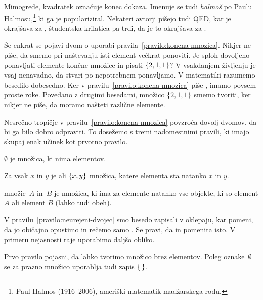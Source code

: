 Mimogrede, kvadratek označuje konec dokaza. Imenuje se tudi \emph{halmoš} po
Paulu Halmosu,\footnote{Paul Halmos (1916--2006), ameriški matematik madžarskega rodu.} ki ga je populariziral. Nekateri avtorji pišejo tudi QED, kar je okrajšava za , študentska krilatica pa trdi, da je to okrajšava za .

Še enkrat se pojavi dvom o uporabi pravila~\ref{pravilo:koncna-mnozica}. Nikjer ne piše, da smemo pri naštevanju isti element večkrat ponoviti. Je sploh dovoljeno ponavljati elemente končne množice in pisati $\left\{2, 1, 1\right\}$?
%
V vsakdanjem življenju je vsaj nenavadno, da stvari po nepotrebnem ponavljamo.
%
V matematiki razumemo besedilo dobesedno. Ker v pravilu~\ref{pravilo:koncna-mnozica} piše , imamo povsem proste roke. Povedano z drugimi besedami, množico
$\left\{2, 1, 1\right\}$ smemo tvoriti, ker nikjer ne piše, da moramo našteti različne elemente.

Nesrečno tropičje v pravilu~\ref{pravilo:koncna-mnozica} povzroča dovolj dvomov, da bi ga bilo dobro odpraviti.
To dosežemo s tremi nadomestnimi pravili, ki imajo skupaj enak učinek kot prvotno pravilo.

\begin{pravilo}
  \label{pravilo:prazna-mnozica}
   $\emptyset$ je množica, ki nima elementov.
\end{pravilo}

\begin{pravilo}
  \label{pravilo:neurejeni-dvojec}
  Za vsak $x$ in $y$ je  ali  $\left\{x, y\right\}$ množica, katere
  elementa sta natanko $x$ in $y$.
\end{pravilo}

\begin{pravilo}
  \label{pravilo:unija}
   množic~$A$ in~$B$ je množica, ki ima za elemente
  natanko vse objekte, ki so element $A$ ali element $B$ (lahko tudi obeh).
\end{pravilo}

V pravilu~\ref{pravilo:neurejeni-dvojec} smo besedo  zapisali v oklepaju, kar
pomeni, da jo običajno opustimo in rečemo samo . Se pravi, da  in  pomenita isto. V primeru nejasnosti raje uporabimo daljšo obliko.

Prvo pravilo pojasni, da lahko tvorimo množico brez elementov.
Poleg oznake~$\emptyset$ se za prazno množico uporablja tudi zapis $\left\{\,\right\}$.

